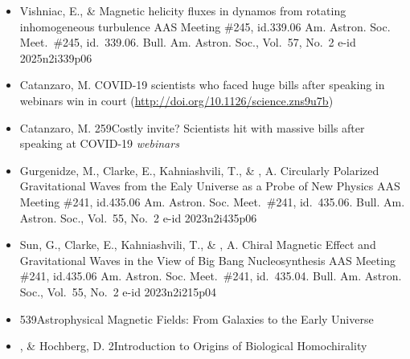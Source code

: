 \begin{itemize}

\item[{77.}~]
Vishniac, E., \& \Brandenburg{}
{Magnetic helicity fluxes in dynamos from rotating inhomogeneous turbulence}
{AAS Meeting \#245, id.339.06}
{Am. Astron. Soc. Meet.~\#245, id.~339.06. Bull. Am. Astron. Soc., Vol.~57, No.~2 e-id 2025n2i339p06}

\item[{76.}~]
Catanzaro, M. %
{COVID-19 scientists who faced huge bills after speaking in webinars win in court}
{(\url{http://doi.org/10.1126/science.zns9u7b})}

\item[{75.}~]
Catanzaro, M.
{259}{Costly invite? Scientists hit with massive bills after speaking at COVID-19 {\em webinars}}

\item[{74.}~]
Gurgenidze, M., Clarke, E., Kahniashvili, T., \& \Brandenburg, A.
{Circularly Polarized Gravitational Waves from the Ealy Universe as a Probe of New Physics}
{AAS Meeting \#241, id.435.06}
{Am. Astron. Soc. Meet.~\#241, id.~435.06. Bull. Am. Astron. Soc., Vol.~55, No.~2 e-id 2023n2i435p06}

\item[{73.}~]
Sun, G., Clarke, E., Kahniashvili, T., \& \Brandenburg, A.
{Chiral Magnetic Effect and Gravitational Waves in the View of Big Bang Nucleosynthesis}
{AAS Meeting \#241, id.435.06}
{Am. Astron. Soc. Meet.~\#241, id.~435.04. Bull. Am. Astron. Soc., Vol.~55, No.~2 e-id 2023n2i215p04}

\item[{72.}~]
\Brandenburg{}
{539}{Astrophysical Magnetic Fields: From Galaxies to the Early Universe}

\item[{71.}~]
\Brandenburg, \& Hochberg, D.
{2}{Introduction to Origins of Biological Homochirality}


\end{itemize}
